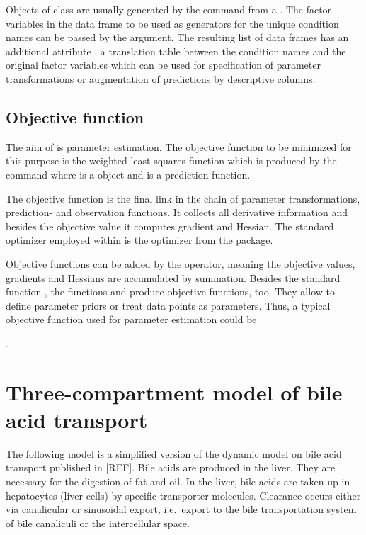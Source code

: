 \documentclass[article]{jss}
\begin{document}
Objects of class  are usually generated by the  command from a . The factor variables in the data frame to be used as generators for the unique condition names can be passed by the  argument. The resulting list of data frames has an additional attribute , a translation table between the condition names and the original factor variables which can be used for specification of parameter transformations or augmentation of predictions by descriptive columns.


\subsection{Objective function}


The aim of  is parameter estimation. The objective function to be minimized for this purpose is the weighted least squares function which is produced by the command  where  is a  object and  is a prediction function.

The objective function is the final link in the chain of parameter transformations, prediction- and observation functions. It collects all derivative information and besides the objective value it computes gradient and Hessian. The standard optimizer employed within  is the  optimizer from the  package.

Objective functions can be added by the  operator, meaning the objective values, gradients and Hessians are accumulated by summation. Besides the standard function , the functions  and  produce objective functions, too. They allow to define parameter priors or treat data points as parameters. Thus, a typical objective function used for parameter estimation could be 
\begin{center}
	.
\end{center}


\section{Three-compartment model of bile acid transport}
\label{sec:example}

The following model is a simplified version of the dynamic model on bile acid transport published in [REF]. Bile acids are produced in the liver. They are necessary for the digestion of fat and oil. In the liver, bile acids are taken up in hepatocytes (liver cells) by specific transporter molecules. Clearance occurs either via canalicular or sinusoidal export, i.e.~export to the bile transportation system of bile canaliculi or the intercellular space.
\end{document}
